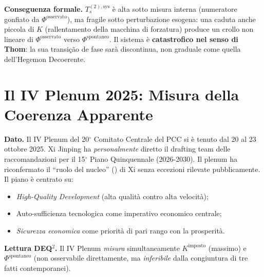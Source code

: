 \Proved{} \textbf{Conseguenza formale.} \(T_s^{(2),\text{sys}}\) è alta
sotto misura interna (numeratore gonfiato da
\(\Phi^{\text{osservato}}\)), ma fragile sotto perturbazione esogena:
una caduta anche piccola di \(K\) (rallentamento della macchina di
forzatura) produce un crollo non lineare di \(\Phi^{\text{osservato}}\)
verso \(\Phi^{\text{spontaneo}}\). Il sistema è \textbf{catastrofico nel
senso di Thom}: la sua transição de fase sarà discontinua, non
graduale come quella dell'Hegemon Decoerente.



\section{Il IV Plenum 2025: Misura della Coerenza
Apparente}\label{il-iv-plenum-2025-misura-della-coerenza-apparente}

\Proved{} \textbf{Dato.} Il IV Plenum del 20$^\circ$ Comitato Centrale del PCC
si è tenuto dal 20 al 23 ottobre 2025. Xi Jinping ha
\emph{personalmente} diretto il drafting team delle raccomandazioni per
il 15$^\circ$ Piano Quinquennale (2026-2030). Il plenum ha riconfermato il
``ruolo del nucleo'' () di Xi senza eccezioni rilevate pubblicamente. Il
piano è centrato su:

\begin{itemize}
\tightlist
\item
  \emph{High-Quality Development} (alta qualità contro alta velocità);
\item
  Auto-sufficienza tecnologica come imperativo economico centrale;
\item
  \emph{Sicurezza economica} come priorità di pari rango con la
  prosperità.
\end{itemize}

\Hypoth{} \textbf{Lettura DEQ$^2$.} Il IV Plenum \emph{misura}
simultaneamente \(K^{\text{imposto}}\) (massimo) e
\(\Phi^{\text{spontaneo}}\) (non osservabile direttamente, ma
\emph{inferibile} dalla congiuntura di tre fatti contemporanei).

